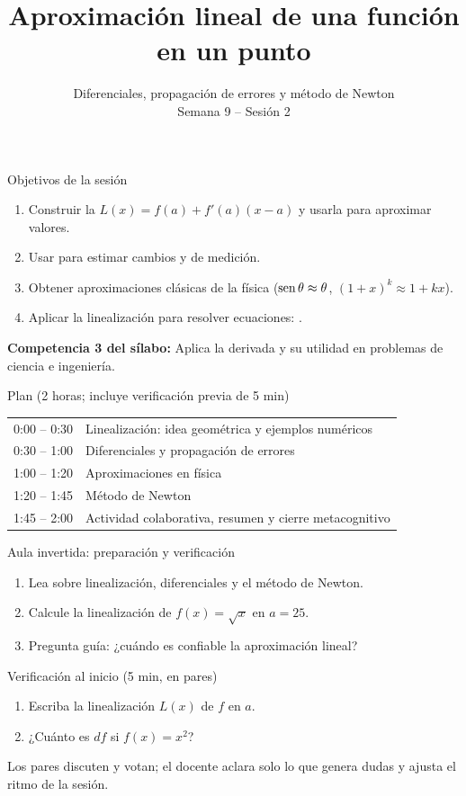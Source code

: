\documentclass[10pt,aspectratio=169]{beamer}
\title[Aproximación lineal]{Aproximación lineal de una función en un punto}
\subtitle{Diferenciales, propagación de errores y método de Newton\\[2pt]\small Semana 9 -- Sesión 2}
\begin{document}
\begin{frame}
  \titlepage
\end{frame}

\begin{frame}{Objetivos de la sesión}
  \begin{enumerate}
    \item Construir la  $L(x)=f(a)+f'(a)(x-a)$ y usarla para aproximar valores.
    \item Usar  para estimar cambios y  de medición.
    \item Obtener aproximaciones clásicas de la física ($\operatorname{sen}\theta\approx\theta$, $(1+x)^k\approx1+kx$).
    \item Aplicar la linealización para resolver ecuaciones: .
  \end{enumerate}
  \vspace{1mm}
  {\small\textbf{Competencia 3 del sílabo:} Aplica la derivada y su utilidad en problemas de ciencia e ingeniería.}
  \begin{block}{Plan (2 horas; incluye verificación previa de 5 min)}
    \begin{tabular}{ll}
      0:00 -- 0:30 & Linealización: idea geométrica y ejemplos numéricos\\
      0:30 -- 1:00 & Diferenciales y propagación de errores\\
      1:00 -- 1:20 & Aproximaciones en física\\
      1:20 -- 1:45 & Método de Newton\\
      1:45 -- 2:00 & Actividad colaborativa, resumen y cierre metacognitivo
    \end{tabular}
  \end{block}
\end{frame}

\begin{frame}{Aula invertida: preparación y verificación}
  \small
  \begin{previa}
    \begin{enumerate}
      \item Lea sobre linealización, diferenciales y el método de Newton.
      \item Calcule la linealización de $f(x)=\sqrt x$ en $a=25$.
      \item Pregunta guía: ¿cuándo es confiable la aproximación lineal?
    \end{enumerate}
  \end{previa}
  \begin{block}{Verificación al inicio (5 min, en pares)}
    \begin{enumerate}
      \item Escriba la linealización $L(x)$ de $f$ en $a$.
      \item ¿Cuánto es $df$ si $f(x)=x^2$?
    \end{enumerate}
    Los pares discuten y votan; el docente aclara solo lo que genera dudas y ajusta el ritmo de la sesión.
  \end{block}
\end{frame}
\end{document}
